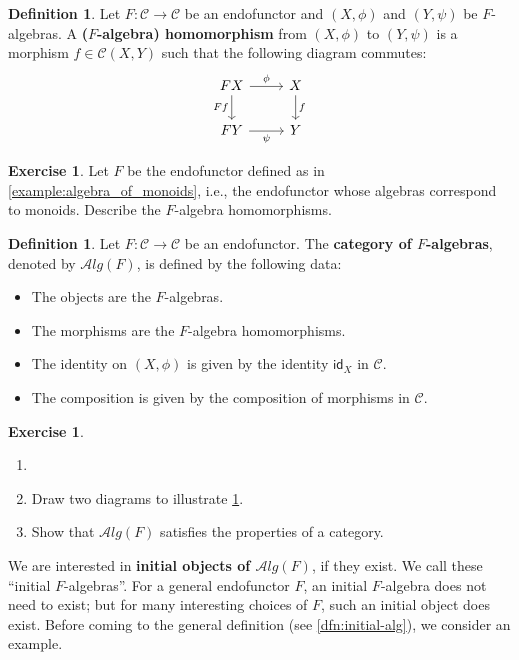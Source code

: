 \documentclass[a4paper,11pt, oneside,titlepage=false]{scrbook}
\theoremstyle{plain}
\theoremstyle{definition}
\newtheorem{dfn}[thm]{Definition}
\newtheorem{exer}[thm]{Exercise}
\newcommand{\cfont}[1]{\ensuremath{\mathsf{#1}}}
\newcommand{\Cat}[1]{\mathcal{#1}}
\newcommand{\CC}{\Cat{C}}
\newcommand{\ALG}[1]{\Cat{A}lg(#1)}
\newcommand{\CHom}[3]{{#1}(#2,#3)}
\newcommand{\Id}[1][]{\cfont{id}_{#1}}
\begin{document}
\begin{dfn}\label{dfn:alg-hom}
Let $F:\CC\to \CC$ be an endofunctor and $(X,\phi)$ and $(Y,\psi)$ be $F$-algebras.
A \textbf{($F$-algebra) homomorphism} from $(X,\phi)$ to $(Y,\psi)$ is a morphism $f\in \CHom{\CC}{X}{Y}$ such that the following diagram commutes:
\[
\begin{tikzcd}
FX
\arrow[r, "\phi"]
\arrow[d,swap, "Ff"]
& X
\arrow[d, "f"]
\\
FY
\arrow[r, swap, "\psi"]
& Y
\end{tikzcd}
\]
\end{dfn}



\begin{exer}
  Let $F$ be the endofunctor defined as in \cref{example:algebra_of_monoids}, i.e., the endofunctor whose algebras correspond to monoids.
  Describe the $F$-algebra homomorphisms.
\end{exer}

\begin{dfn}\label{definition:category_of_Falgebras} Let $F:\CC\to \CC$ be an endofunctor. The \textbf{category of $F$-algebras}, denoted by $\ALG{F}$, is defined by the following data:
\begin{itemize}
\item The objects are the $F$-algebras.
\item The morphisms are the $F$-algebra homomorphisms.
\item The identity on $(X,\phi)$ is given by the identity $\Id[X]$ in $\CC$.
\item The composition is given by the composition of morphisms in $\CC$.
\end{itemize}
\end{dfn}

\begin{exer}
  \begin{enumerate}
  \item[]
  \item Draw two diagrams to illustrate \cref{definition:category_of_Falgebras}.
  \item Show that $\ALG{F}$ satisfies the properties of a category.
  \end{enumerate}
\end{exer}

We are interested in \textbf{initial objects of $\ALG{F}$}, if they exist.
We call these ``initial $F$-algebras''.
For a general endofunctor $F$, an initial $F$-algebra does not need to exist;
but for many interesting choices of $F$, such an initial object does exist.
Before coming to the general definition (see \cref{dfn:initial-alg}),
we consider an example.
\end{document}
